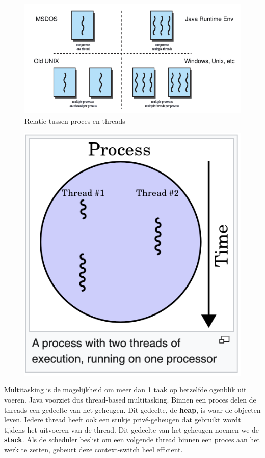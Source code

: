 \documentclass{tstextbook}
\begin{document}
\begin{figure}[H]
  \includegraphics[width=\linewidth]{images/h9/process_threads.png} 
  \caption{Relatie tussen proces en threads}
  \label{fig:proces_thread}
\end{figure}

\begin{figure}[H]
  \includegraphics[scale=1]{images/h9/process_with_two_threads.png}
  \label{fig:proces_thread_2}
\end{figure}

Multitasking is de mogelijkheid om meer dan 1 taak op hetzelfde ogenblik uit voeren.
Java voorziet dus thread-based multitasking. Binnen een proces delen de threads een gedeelte van het geheugen. Dit gedeelte, de \textbf{heap}, is waar de objecten leven.
Iedere thread heeft ook een stukje priv\'e-geheugen dat gebruikt wordt tijdens het uitvoeren van de thread. Dit gedeelte van het geheugen noemen we de \textbf{stack}.
Als de scheduler beslist om een volgende thread binnen een proces aan het werk te zetten, gebeurt deze context-switch heel efficient.
\end{document}
